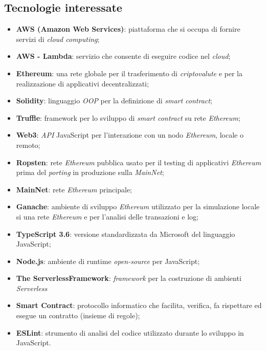 \subsection{Tecnologie interessate}
\begin{itemize}
	\item \textbf{AWS (Amazon Web Services)}: piattaforma che si occupa di fornire servizi di \textit{cloud computing\glos};
	\item \textbf{AWS - Lambda}: servizio che consente di eseguire codice nel \textit{cloud\glos};
	\item \textbf{Ethereum\glos}: una rete globale per il trasferimento di \textit{criptovalute\glo} e per la realizzazione di applicativi decentralizzati;
	\item \textbf{Solidity}: linguaggio \textit{OOP\glo} per la definizione di \textit{smart contract\glos};
	\item \textbf{Truffle}: framework per lo sviluppo di \textit{smart contract\glo} su rete \textit{Ethereum\glos};
	\item \textbf{Web3}: \textit{API\glo} JavaScript per l'interazione con un nodo \textit{Ethereum\glos}, locale o remoto;
	\item \textbf{Ropsten}: rete \textit{Ethereum\glo} pubblica usato per il testing di applicativi \textit{Ethereum\glo} prima del \textit{porting\glo} in produzione sulla \textit{MainNet\glos};
	\item \textbf{MainNet\glos}: rete \textit{Ethereum\glo} principale;
	\item \textbf{Ganache}: ambiente di sviluppo \textit{Ethereum\glo} utilizzato per la simulazione locale si una rete \textit{Ethereum\glo} e per l'analisi delle transazioni e log;
	\item \textbf{TypeScript 3.6}: versione standardizzata da Microsoft del linguaggio JavaScript;
	\item \textbf{Node.js}: ambiente di runtime \textit{open-source\glo} per JavaScript;
	\item \textbf{The Serverless\glo Framework\glos}: \textit{framework\glo} per la costruzione di ambienti \textit{Serverless\glo}
	\item \textbf{Smart Contract\glos}: protocollo informatico che facilita, verifica, fa rispettare ed esegue un contratto (insieme di regole);
	\item \textbf{ESLint}: strumento di analisi del codice utilizzato durante lo sviluppo in JavaScript.
\end{itemize}

